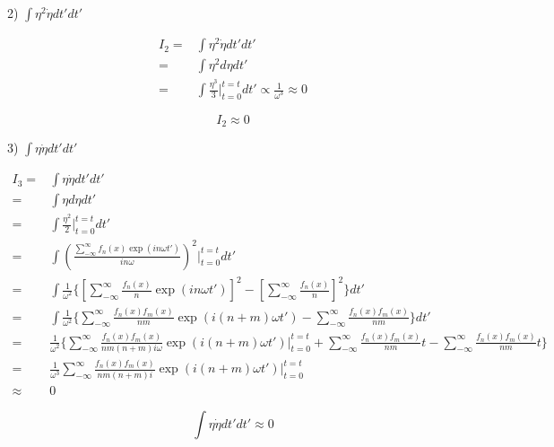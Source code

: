 2) $\int \eta^2\dot{\eta} dt' dt'$

    \begin{equation}\label{eq:B.15}
        \begin{split}
            I_2=&\int \eta^2\dot{\eta} dt' dt'\\
            =&\int \eta^2 d\eta dt' \\
            =& \int \frac{\eta^3}{3} |^{t=t}_{t=0} dt' \propto \frac{1}{\omega^3} \approx 0
        \end{split}
    \end{equation}

    \begin{equation}\label{eq:B.16}
            I_2\approx 0
    \end{equation}

3) $\int \eta\dot{\eta} dt' dt'$

    \begin{equation}\label{eq:B.17}
        \begin{split}
            I_3=&\int \eta\dot{\eta} dt' dt'\\
            =&\int \eta d\eta dt' \\
            =& \int \frac{\eta^2}{2} |^{t=t}_{t=0} dt' \\
            =& \int (\frac{\sum_{-\infty}^{\infty} f_n(x)\exp(i n\omega t')}{in\omega})^2|^{t=t}_{t=0} dt'\\
            =& \int \frac{1}{\omega^2} \{[\sum_{-\infty}^{\infty} \frac{f_n(x)}{n}\exp(i n\omega t')]^2-[\sum_{-\infty}^{\infty} \frac{f_n(x)}{n}]^2\} dt'\\
            =&  \int \frac{1}{\omega^2} \{\sum_{-\infty}^{\infty} \frac{f_n(x)f_m(x)}{nm}\exp(i (n+m)\omega t')-\sum_{-\infty}^{\infty} \frac{f_n(x)f_m(x)}{nm}\} dt'\\
            =&  \frac{1}{\omega^2} \{\sum_{-\infty}^{\infty} \frac{f_n(x)f_m(x)}{nm(n+m)i\omega}\exp(i (n+m)\omega t')|^{t=t}_{t=0}+\sum_{-\infty}^{\infty} \frac{f_n(x)f_m(x)}{nm}t-\sum_{-\infty}^{\infty}\frac{f_n(x)f_m(x)}{nm}t\}\\
            =& \frac{1}{\omega^3} \sum_{-\infty}^{\infty} \frac{f_n(x)f_m(x)}{nm(n+m)i}\exp(i (n+m)\omega t')|^{t=t}_{t=0}\\
            \approx & 0
        \end{split}
    \end{equation}
    
    \begin{equation}\label{eq:B.18}
            \int \eta\dot{\eta} dt' dt' \approx 0 
    \end{equation}

